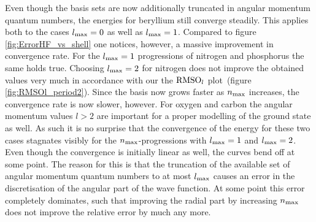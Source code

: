 Even though the basis sets
are now additionally truncated in angular momentum quantum numbers,
the \HF energies for beryllium still converge steadily.
This applies both to the cases $l_\text{max} = 0$ as well as $l_\text{max} = 1$.
Compared to figure \vref{fig:ErrorHF_vs_shell} one notices,
however, a massive improvement in convergence rate.
For the $l_\text{max} = 1$ progressions of nitrogen and phosphorus the same holds true.
Choosing $l_\text{max} = 2$ for nitrogen does not improve the obtained
values very much
in accordance with our the $\text{RMSO}_l$ plot~(figure \ref{fig:RMSOl_period2}).
Since the basis now grows faster as $n_\text{max}$ increases,
the convergence rate is now slower, however.
For oxygen and carbon the angular momentum values $l > 2$ are important
for a proper modelling of the ground state as well.
As such it is no surprise that the convergence of the \HF energy
for these two cases stagnates visibly for the $n_\text{max}$-progressions
with $l_\text{max} = 1$ and $l_\text{max} = 2$.
Even though the convergence is initially linear as well,
the curves bend off at some point.
The reason for this is that the truncation of the available
set of angular momentum quantum numbers to at most $l_\text{max}$ causes
an error in the discretisation of the angular part of the wave function.
At some point this error completely dominates,
such that improving the radial part by increasing $n_\text{max}$
does not improve the relative error by much any more.

